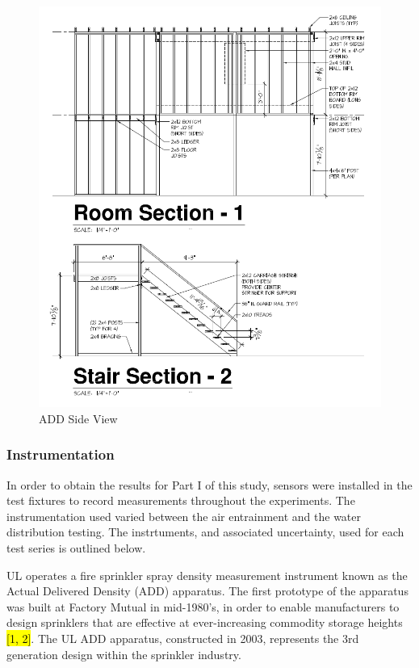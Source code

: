 \documentclass{article}
\begin{document}
\clearpage

\begin{figure}[!ht]
	\centering
	\includegraphics[width=5.5in]{Figures/Water_Distribution/ADDsideviewprint.png}
	\caption{ADD Side View}
	\label{fig:ADD_Side_View}
\end{figure}

\clearpage

\subsubsection{Instrumentation}

In order to obtain the results for Part I of this study, sensors were installed in the test fixtures to record measurements throughout the experiments. The instrumentation used varied between the air entrainment and the water distribution testing. The instrtuments, and associated uncertainty, used for each test series is outlined below.

UL operates a fire sprinkler spray density measurement instrument known as the Actual Delivered Density (ADD) apparatus. The first prototype of the apparatus was built at Factory Mutual in mid-1980’s, in order to enable manufacturers to design sprinklers that are effective at ever-increasing commodity storage heights \hl{[1, 2]}. The UL ADD apparatus, constructed in 2003, represents the 3rd generation design within the sprinkler industry. 
 
\end{document}
